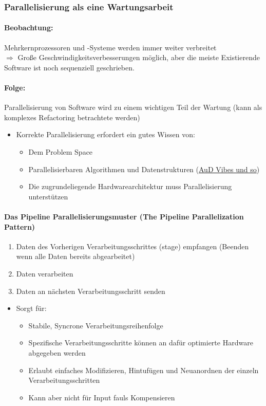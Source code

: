 \documentclass[ngerman,color=3b]{tuda_summary}
\begin{document}
\subsubsection{Parallelisierung als eine Wartungsarbeit}
\paragraph{Beobachtung:} Mehrkernprozessoren und -Systeme werden immer weiter verbreitet\\
$\Rightarrow$ Große Geschwindigkeitsverbesserungen möglich, aber die meiste Existierende Software ist noch sequenziell geschrieben.
\paragraph{Folge:} Parallelisierung von Software wird zu einem wichtigen Teil der Wartung (kann als komplexes Refactoring betrachtete werden)

\begin{itemize}
    \item Korrekte Parallelisierung erfordert ein gutes Wissen von:\begin{itemize}
              \item Dem Problem Space
              \item Parallelisierbaren Algorithmen und Datenstrukturen (\href{https://github.com/Rdeisenroth/AuD-Zusammenfassung/blob/master/AuD-Zusammenfassung-2020.pdf}{AuD Vibes und so})
              \item Die zugrundeliegende Hardwarearchitektur muss Parallelisierung unterstützen
          \end{itemize}
\end{itemize}
\paragraph{Das Pipeline Parallelisierungsmuster (The Pipeline Parallelization Pattern)}\begin{enumerate}
    \item Daten des Vorherigen Verarbeitungsschrittes (stage) empfangen (Beenden wenn alle Daten bereits abgearbeitet)
    \item Daten verarbeiten
    \item Daten an nächsten Verarbeitungsschritt senden
\end{enumerate}
\begin{itemize}
    \item Sorgt für:\begin{itemize}
              \item Stabile, Syncrone Verarbeitungsreihenfolge
              \item Spezifische Verarbeitungsschritte können an dafür optimierte Hardware abgegeben werden
              \item Erlaubt einfaches Modifizieren, Hintufügen und Neuanordnen der einzeln Verarbeitungsschritten
              \item Kann aber nicht für Input fauls Kompensieren
          \end{itemize}
\end{itemize}
\clearpage
\end{document}
